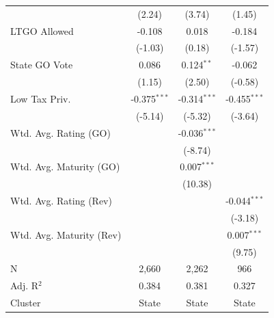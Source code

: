 \begin{tabular*}{\textwidth}{@{\extracolsep{\fill}}lccc}
                              & (2.24)                     & (3.74)             & (1.45)\\   
   LTGO Allowed               & -0.108                      & 0.018               & -0.184\\   
                              & (-1.03)                    & (0.18)             & (-1.57)\\   
   State GO Vote              & 0.086                       & 0.124$^{**}$        & -0.062\\   
                              & (1.15)                     & (2.50)             & (-0.58)\\   
   Low Tax Priv.              & -0.375$^{***}$              & -0.314$^{***}$      & -0.455$^{***}$\\   
                              & (-5.14)                    & (-5.32)            & (-3.64)\\   
   Wtd. Avg. Rating (GO)      &                             & -0.036$^{***}$      &   \\   
                              &                             & (-8.74)            &   \\   
   Wtd. Avg. Maturity (GO)    &                             & 0.007$^{***}$       &   \\   
                              &                             & (10.38)            &   \\   
   Wtd. Avg. Rating (Rev)     &                             &                     & -0.044$^{***}$\\   
                              &                             &                     & (-3.18)\\   
   Wtd. Avg. Maturity (Rev)   &                             &                     & 0.007$^{***}$\\   
                              &                             &                     & (9.75)\\   
   \hline
   N               & 2,660                       & 2,262               & 966\\  
   Adj. R$^2$             & 0.384                       & 0.381               & 0.327\\  
   Cluster              & State & State & State\\  
   \bottomrule
\end{tabular*}
\par\endgroup

